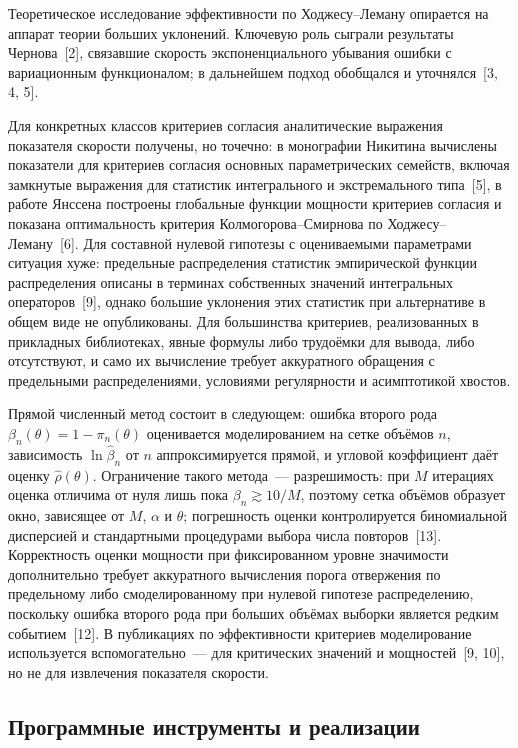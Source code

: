 Теоретическое исследование эффективности по Ходжесу--Леману опирается на аппарат теории
больших уклонений. Ключевую роль сыграли результаты Чернова~[2], связавшие скорость
экспоненциального убывания ошибки с вариационным функционалом; в дальнейшем подход
обобщался и уточнялся~[3, 4, 5].

Для конкретных классов критериев согласия аналитические выражения показателя скорости
получены, но точечно: в монографии Никитина вычислены показатели для критериев согласия
основных параметрических семейств, включая замкнутые выражения для статистик интегрального
и экстремального типа~[5], в работе Янссена построены глобальные функции мощности
критериев согласия и показана оптимальность критерия Колмогорова--Смирнова по
Ходжесу--Леману~[6]. Для составной нулевой гипотезы с оцениваемыми параметрами ситуация
хуже: предельные распределения статистик эмпирической функции распределения описаны в
терминах собственных значений интегральных операторов~[9], однако большие уклонения этих
статистик при альтернативе в общем виде не опубликованы. Для большинства критериев,
реализованных в прикладных библиотеках, явные формулы либо трудоёмки для вывода, либо
отсутствуют, и само их вычисление требует аккуратного обращения с предельными
распределениями, условиями регулярности и асимптотикой хвостов.

Прямой численный метод состоит в следующем: ошибка второго рода
$\beta_n(\theta) = 1-\pi_n(\theta)$ оценивается моделированием на сетке объёмов $n$,
зависимость $\ln\hat\beta_n$ от $n$ аппроксимируется прямой, и угловой коэффициент даёт
оценку $\hat\rho(\theta)$. Ограничение такого метода~--- разрешимость: при $M$ итерациях оценка
отличима от нуля лишь пока $\beta_n \gtrsim 10/M$, поэтому сетка объёмов образует окно,
зависящее от $M$, $\alpha$ и $\theta$; погрешность оценки контролируется биномиальной
дисперсией и стандартными процедурами выбора числа повторов~[13]. Корректность оценки
мощности при фиксированном уровне значимости дополнительно требует аккуратного вычисления
порога отвержения по предельному либо смоделированному при нулевой гипотезе распределению,
поскольку ошибка второго рода при больших объёмах выборки является редким событием~[12].
В публикациях по эффективности критериев моделирование используется вспомогательно~--- для
критических значений и мощностей~[9, 10], но не для извлечения показателя скорости.

\subsection{Программные инструменты и реализации}
\label{ssec:tools}

